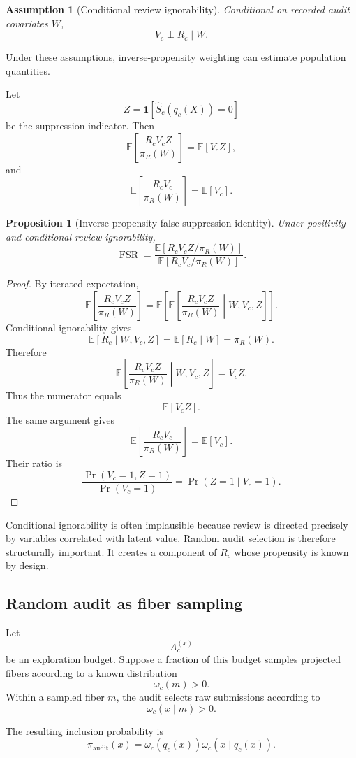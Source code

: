 \documentclass[11pt]{article}
\newtheorem{proposition}[definition]{Proposition}
\newtheorem{assumption}[definition]{Assumption}
\theoremstyle{definition}
\DeclareMathOperator{\Prob}{Pr}
\newcommand{\E}{\mathbb{E}}
\newcommand{\ind}{\mathbf{1}}
\begin{document}
\begin{assumption}[Conditional review ignorability]
Conditional on recorded audit covariates \(W\),
\[
V_c\perp R_c\mid W.
\]
\end{assumption}

Under these assumptions, inverse-propensity weighting can estimate population quantities.

Let
\[
Z
=
\ind[\widehat S_c(q_c(X))=0]
\]
be the suppression indicator. Then
\[
\E
\left[
\frac{R_cV_cZ}{\pi_R(W)}
\right]
=
\E[V_cZ],
\]
and
\[
\E
\left[
\frac{R_cV_c}{\pi_R(W)}
\right]
=
\E[V_c].
\]

\begin{proposition}[Inverse-propensity false-suppression identity]
Under positivity and conditional review ignorability,
\[
\operatorname{FSR}
=
\frac{
\E\left[
R_cV_cZ/\pi_R(W)
\right]
}{
\E\left[
R_cV_c/\pi_R(W)
\right]
}.
\]
\end{proposition}

\begin{proof}
By iterated expectation,
\[
\E
\left[
\frac{R_cV_cZ}{\pi_R(W)}
\right]
=
\E
\left[
\E
\left[
\frac{R_cV_cZ}{\pi_R(W)}
\middle|
W,V_c,Z
\right]
\right].
\]
Conditional ignorability gives
\[
\E[R_c\mid W,V_c,Z]
=
\E[R_c\mid W]
=
\pi_R(W).
\]
Therefore
\[
\E
\left[
\frac{R_cV_cZ}{\pi_R(W)}
\middle|
W,V_c,Z
\right]
=
V_cZ.
\]
Thus the numerator equals
\[
\E[V_cZ].
\]
The same argument gives
\[
\E
\left[
\frac{R_cV_c}{\pi_R(W)}
\right]
=
\E[V_c].
\]
Their ratio is
\[
\frac{\Prob(V_c=1,Z=1)}{\Prob(V_c=1)}
=
\Prob(Z=1\mid V_c=1).
\]
\end{proof}

Conditional ignorability is often implausible because review is directed precisely by variables correlated with latent value. Random audit selection is therefore structurally important. It creates a component of \(R_c\) whose propensity is known by design.

\subsection{Random audit as fiber sampling}

Let
\[
A_c^{(x)}
\]
be an exploration budget. Suppose a fraction of this budget samples projected fibers according to a known distribution
\[
\omega_c(m)>0.
\]
Within a sampled fiber \(m\), the audit selects raw submissions according to
\[
\omega_c(x\mid m)>0.
\]

The resulting inclusion probability is
\[
\pi_{\mathrm{audit}}(x)
=
\omega_c(q_c(x))
\omega_c(x\mid q_c(x)).
\]
\end{document}
